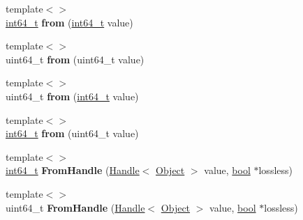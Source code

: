 \begin{DoxyCompactItemize}
\item 
\mbox{\label{classv8_1_1internal_1_1FixedTypedArray_ab7be2d0933062bf6ec06f5d6213bd104}} 
{\footnotesize template$<$$>$ }\\\mbox{\hyperlink{classint64__t}{int64\+\_\+t}} {\bfseries from} (\mbox{\hyperlink{classint64__t}{int64\+\_\+t}} value)
\item 
\mbox{\label{classv8_1_1internal_1_1FixedTypedArray_ab527b3289ab667c4692016b1bf29e749}} 
{\footnotesize template$<$$>$ }\\uint64\+\_\+t {\bfseries from} (uint64\+\_\+t value)
\item 
\mbox{\label{classv8_1_1internal_1_1FixedTypedArray_a0d8b0a5d7be9a8870268d6f417a4cfaa}} 
{\footnotesize template$<$$>$ }\\uint64\+\_\+t {\bfseries from} (\mbox{\hyperlink{classint64__t}{int64\+\_\+t}} value)
\item 
\mbox{\label{classv8_1_1internal_1_1FixedTypedArray_a43990360a1d021932d80f34fde9ce934}} 
{\footnotesize template$<$$>$ }\\\mbox{\hyperlink{classint64__t}{int64\+\_\+t}} {\bfseries from} (uint64\+\_\+t value)
\item 
\mbox{\label{classv8_1_1internal_1_1FixedTypedArray_a531cea0980f7d10bf408b4932a7687db}} 
{\footnotesize template$<$$>$ }\\\mbox{\hyperlink{classint64__t}{int64\+\_\+t}} {\bfseries From\+Handle} (\mbox{\hyperlink{classv8_1_1internal_1_1Handle}{Handle}}$<$ \mbox{\hyperlink{classv8_1_1internal_1_1Object}{Object}} $>$ value, \mbox{\hyperlink{classbool}{bool}} $\ast$lossless)
\item 
\mbox{\label{classv8_1_1internal_1_1FixedTypedArray_a3865e5c2f19b4f89ad9b86628df3748a}} 
{\footnotesize template$<$$>$ }\\uint64\+\_\+t {\bfseries From\+Handle} (\mbox{\hyperlink{classv8_1_1internal_1_1Handle}{Handle}}$<$ \mbox{\hyperlink{classv8_1_1internal_1_1Object}{Object}} $>$ value, \mbox{\hyperlink{classbool}{bool}} $\ast$lossless)
\item 

\end{DoxyCompactItemize}

